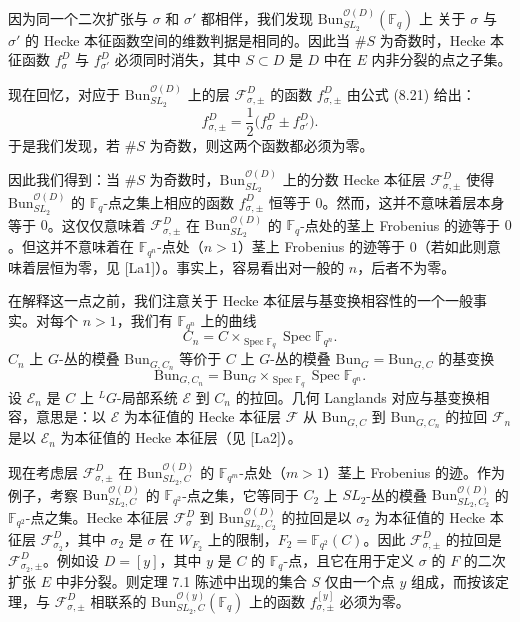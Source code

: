 \documentclass[11pt,a4paper]{article}
\newcommand{\Bun}{\mathrm{Bun}}
\begin{document}
因为同一个二次扩张与 $\sigma$ 和 $\sigma'$ 都相伴，我们发现 $\Bun^{\mathcal{O}(D)}_{SL_2}(\mathbb{F}_q)$ 上
关于 $\sigma$ 与 $\sigma'$ 的 Hecke 本征函数空间的维数判据是相同的。因此当 $\#S$ 为奇数时，Hecke 本征函数 $f^D_\sigma$ 与 $f^D_{\sigma'}$ 必须同时消失，其中 $S\subset D$ 是 $D$ 中在 $E$ 内非分裂的点之子集。

现在回忆，对应于 $\Bun^{\mathcal{O}(D)}_{SL_2}$ 上的层 $\mathcal{F}^D_{\sigma,\pm}$ 的函数 $f^D_{\sigma,\pm}$ 由公式 (8.21) 给出：
\begin{equation}\tag{8.24}
f^D_{\sigma,\pm} = \frac{1}{2}\bigl(f^D_\sigma \pm f^D_{\sigma'}\bigr).
\end{equation}
于是我们发现，若 $\#S$ 为奇数，则这两个函数都必须为零。

因此我们得到：当 $\#S$ 为奇数时，$\Bun^{\mathcal{O}(D)}_{SL_2}$ 上的分数 Hecke 本征层 $\mathcal{F}^D_{\sigma,\pm}$ 使得 $\Bun^{\mathcal{O}(D)}_{SL_2}$ 的 $\mathbb{F}_q$-点之集上相应的函数 $f^D_{\sigma,\pm}$ 恒等于 $0$。然而，这并不意味着层本身等于 $0$。这仅仅意味着 $\mathcal{F}^D_{\sigma,\pm}$ 在 $\Bun^{\mathcal{O}(D)}_{SL_2}$ 的 $\mathbb{F}_q$-点处的茎上 Frobenius 的迹等于 $0$。但这并不意味着在 $\mathbb{F}_{q^n}$-点处（$n > 1$）茎上 Frobenius 的迹等于 $0$（若如此则意味着层恒为零，见 [La1]）。事实上，容易看出对一般的 $n$，后者不为零。

在解释这一点之前，我们注意关于 Hecke 本征层与基变换相容性的一个一般事实。对每个 $n > 1$，我们有 $\mathbb{F}_{q^n}$ 上的曲线
\[
C_n = C\times_{\operatorname{Spec}\mathbb{F}_q}\operatorname{Spec}\mathbb{F}_{q^n}.
\]
$C_n$ 上 $G$-丛的模叠 $\Bun_{G,C_n}$ 等价于 $C$ 上 $G$-丛的模叠 $\Bun_G = \Bun_{G,C}$ 的基变换
\[
\Bun_{G,C_n} = \Bun_G\times_{\operatorname{Spec}\mathbb{F}_q}\operatorname{Spec}\mathbb{F}_{q^n}.
\]
设 $\mathcal{E}_n$ 是 $C$ 上 ${}^{L}G$-局部系统 $\mathcal{E}$ 到 $C_n$ 的拉回。几何 Langlands 对应与基变换相容，意思是：以 $\mathcal{E}$ 为本征值的 Hecke 本征层 $\mathcal{F}$ 从 $\Bun_{G,C}$ 到 $\Bun_{G,C_n}$ 的拉回 $\mathcal{F}_n$ 是以 $\mathcal{E}_n$ 为本征值的 Hecke 本征层（见 [La2]）。

现在考虑层 $\mathcal{F}^D_{\sigma,\pm}$ 在 $\Bun^{\mathcal{O}(D)}_{SL_2,C}$ 的 $\mathbb{F}_{q^m}$-点处（$m > 1$）茎上 Frobenius 的迹。作为例子，考察 $\Bun^{\mathcal{O}(D)}_{SL_2,C}$ 的 $\mathbb{F}_{q^2}$-点之集，它等同于 $C_2$ 上 $SL_2$-丛的模叠 $\Bun^{\mathcal{O}(D)}_{SL_2,C_2}$ 的 $\mathbb{F}_{q^2}$-点之集。Hecke 本征层 $\mathcal{F}^D_\sigma$ 到 $\Bun^{\mathcal{O}(D)}_{SL_2,C_2}$ 的拉回是以 $\sigma_2$ 为本征值的 Hecke 本征层 $\mathcal{F}^D_{\sigma_2}$，其中 $\sigma_2$ 是 $\sigma$ 在 $W_{F_2}$ 上的限制，$F_2 = \mathbb{F}_{q^2}(C)$。因此 $\mathcal{F}^D_{\sigma,\pm}$ 的拉回是 $\mathcal{F}^D_{\sigma_2,\pm}$。例如设 $D = [y]$，其中 $y$ 是 $C$ 的 $\mathbb{F}_q$-点，且它在用于定义 $\sigma$ 的 $F$ 的二次扩张 $E$ 中非分裂。则定理 7.1 陈述中出现的集合 $S$ 仅由一个点 $y$ 组成，而按该定理，与 $\mathcal{F}^D_{\sigma,\pm}$ 相联系的 $\Bun^{\mathcal{O}(y)}_{SL_2,C}(\mathbb{F}_q)$ 上的函数 $f^{[y]}_{\sigma,\pm}$ 必须为零。
\end{document}
